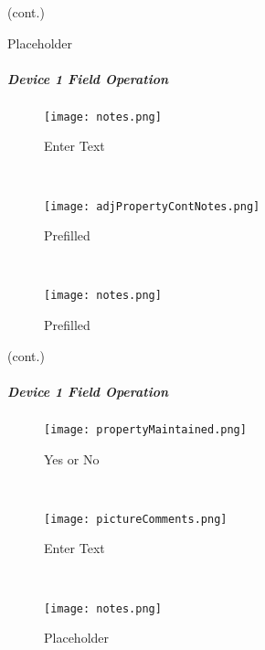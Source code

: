 (cont.)
\vspace{.5in}

\vspace{3in}

\noindent Placeholder
\vspace{2.5in}

\clearpage
\subparagraph*{Device 1 Field Operation}
\begin{wrapfigure}{r}{0.4\textwidth}
\centering
    \texttt{[image: notes.png]}
\caption {Enter Text}
\vspace{.05in}

\HRule \\[.4cm] %
\vspace{.05in}

    \texttt{[image: adjPropertyContNotes.png]}
\caption{Prefilled}
\vspace{.05in}

\HRule \\[.4cm] %
\vspace{.05in}

    \texttt{[image: notes.png]}
\caption{Prefilled}
\end{wrapfigure}

(cont.)
\vspace{.5in}

\vspace{3in}

\noindent{} {\LARGE\lookArrow}
\vspace{2.5in}

\noindent{} {\LARGE\lookArrow}
\clearpage
\subparagraph*{Device 1 Field Operation}
\begin{wrapfigure}{r}{0.4\textwidth}
\centering
    \texttt{[image: propertyMaintained.png]}
\caption {Yes or No}
\vspace{.1in}

\HRule \\[.4cm] %
\vspace{.1in}

    \texttt{[image: pictureComments.png]}
\caption{Enter Text}
\vspace{.1in}

\HRule \\[.4cm] %
\vspace{.1in}

    \texttt{[image: notes.png]}
\caption{Placeholder}
\end{wrapfigure}

